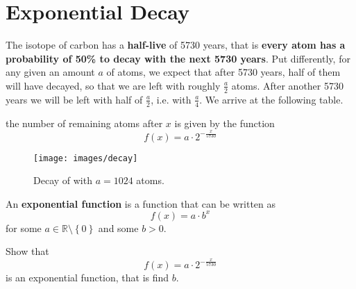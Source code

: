 \section{Exponential Decay}
The  isotope of carbon has a \textbf{half-live} of 5730 years, that is \textbf{every  atom has a probability of 50\% to decay with the next 5730 years}.
Put differently, for any given an amount $a$ of  atoms, we expect that after 5730 years, half of them will have decayed, so that we are left with roughly $\frac{a}{2}$ atoms.
After another 5730 years we will be left with half of $\frac{a}{2}$, i.e. with $\frac{a}{4}$.
We arrive at the following table.
\begin{figure}[ht]
	\centering
\end{figure}
the number of remaining atoms after $x$ is given by the function
\begin{equation*}
	f\left(x\right)=a\cdot 2^{-\frac{x}{5730}}
\end{equation*}
\begin{figure}[ht]
	\centering
	\texttt{[image: images/decay]}
	\caption{Decay of  with $a=1024$ atoms.}
\end{figure}
\begin{tcolorbox}
	An \textbf{exponential function} is a function that can be written as
	\begin{equation*}
		f\left(x\right)=a\cdot b^x
	\end{equation*}
	for some $a\in\mathbb R\setminus\left\{0\right\}$ and some $b>0$.
\end{tcolorbox}
\begin{exercise}
	Show that
	\begin{equation*}
		f\left(x\right)=a\cdot 2^{-\frac{x}{5730}}
	\end{equation*}
	is an exponential function, that is find $b$.
\end{exercise}

